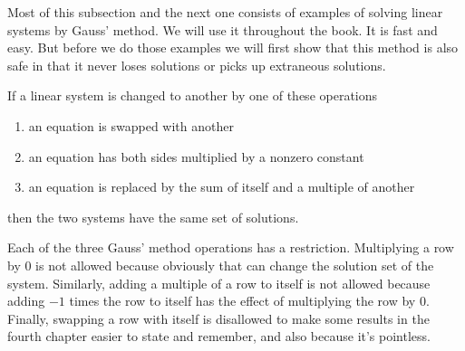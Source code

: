 Most of this subsection and the next one consists of examples
of solving linear systems by Gauss' method.
We will use it throughout the book.
It is fast and easy.
But before we do those examples we will first show that
this method is also safe in that it never loses solutions or 
picks up extraneous solutions.

\begin{theorem}
 \label{th:GaussMethod}
If a linear system is changed to another by one of these operations
\begin{enumerate}
  \setlength{\itemsep}{0ex}
  \item
    an equation is swapped with another
  \item
    an equation has both sides multiplied by a nonzero constant
  \item
    an equation is replaced by the sum of itself and a multiple of another
\end{enumerate}
then the two systems have the same set of solutions.
\end{theorem}

Each of the three Gauss' method operations has a restriction.
Multiplying a row by \( 0 \) is not allowed because obviously that
can change the solution set of the system.
Similarly, adding a multiple of a row to itself is not allowed because
adding \( -1 \) times the row to itself has the effect of multiplying the row
by \( 0 \).
Finally, swapping a row with itself is disallowed
to make some results in the fourth chapter easier to state and remember,
and also because it's pointless.


